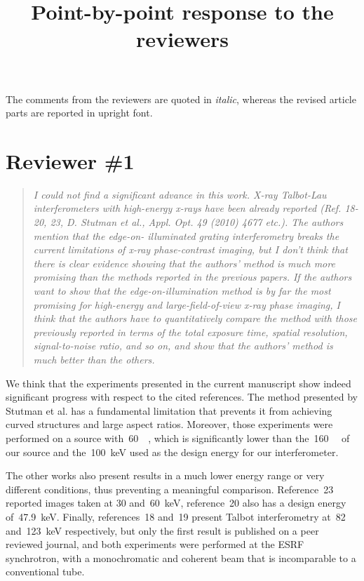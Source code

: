 \documentclass[a4paper,english]{scrartcl}
\title{Point-by-point response to the reviewers}
\date{}
\newenvironment{reviewerquote}{\begin{quote}\itshape}{\end{quote}}
\begin{document}
\maketitle

The comments from the reviewers are quoted in \emph{italic}, whereas the
revised article parts are reported in upright font.
\section*{Reviewer \#1}
\begin{reviewerquote}
    I could not find a significant advance in this work. X-ray Talbot-Lau
    interferometers with high-energy x-rays have been already reported (Ref.
    18-20, 23, D. Stutman et al., Appl. Opt. 49 (2010) 4677 etc.). The
    authors mention that the edge-on- illuminated grating interferometry
    breaks the current limitations of x-ray phase-contrast imaging, but I
    don't think that there is clear evidence showing that the authors'
    method is much more promising than the methods reported in the previous
    papers. If the authors want to show that the edge-on-illumination method
    is by far the most promising for high-energy and large-field-of-view
    x-ray phase imaging, I think that the authors have to quantitatively
    compare the method with those previously reported in terms of the total
    exposure time, spatial resolution, signal-to-noise ratio, and so on, and
    show that the authors' method is much better than the others.
\end{reviewerquote}
We think that the experiments presented in the current manuscript show
indeed significant progress with respect to the cited references.
The method presented by Stutman et al. has a fundamental limitation that
prevents it from achieving curved structures and large aspect ratios.
Moreover, those experiments were performed on a source
with~\SI{60}{\kilo\voltpeak}, which is significantly lower than
the~\SI{160}{\kilo\voltpeak} of our source and the~\SI{100}{\kilo\eV} used
as the design energy for our interferometer.

The other works also present results in a much lower energy range or very
different conditions, thus preventing a meaningful comparison.
Reference~23 reported images taken at \num{30} and~\SI{60}{\kilo\eV},
reference~20 also has a design energy of~\SI{47.9}{\kilo\eV}. Finally,
references~18 and~19 present Talbot interferometry at~\num{82}
and~\SI{123}{\kilo\eV} respectively, but only the first result is published
on a peer reviewed journal, and both experiments were performed at the ESRF
synchrotron, with a monochromatic and coherent beam that is incomparable to
a conventional tube.
\end{document}
